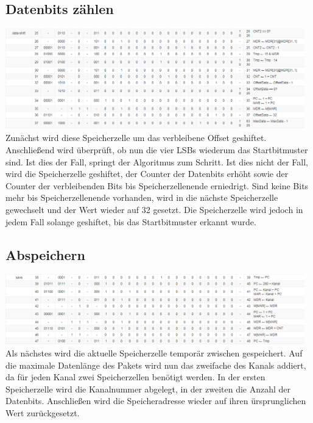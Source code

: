 \documentclass[12pt,titlepage,german,a4]{article}
\begin{document}
    \subsection{Datenbits z{\"a}hlen}
	\includegraphics[width=13cm]{img/k4.png} \\
    Zun{\"a}chst wird diese Speicherzelle um das verbleibene Offset geshiftet. Anschlie{\ss}end wird {\"u}berpr{\"u}ft, ob nun die vier LSBs wiederum das Startbitmuster sind. Ist dies der Fall, springt der Algoritmus zum Schritt. Ist dies nicht der Fall, wird die Speicherzelle geshiftet, der Counter der Datenbits erh{\"o}ht sowie der Counter der verbleibenden Bits bis Speicherzellenende erniedrigt. Sind keine Bits mehr bis Speicherzellenende vorhanden, wird in die n{\"a}chste Speicherzelle gewechselt und der Wert wieder auf 32 gesetzt. Die Speicherzelle wird jedoch in jedem Fall solange geshiftet, bis das Startbitmuster erkannt wurde.

    \subsection{Abspeichern}
	\includegraphics[width=13cm]{img/k5.png} \\
    Als n{\"a}chstes wird die aktuelle Speicherzelle tempor{\"a}r zwischen gespeichert. Auf die maximale Datenl{\"a}nge des Pakets wird nun das zweifache des Kanals addiert, da f{\"u}r jeden Kanal zwei Speicherzellen ben{\"o}tigt werden. In der ersten Speicherzelle wird die Kanalnummer abgelegt, in der zweiten die Anzahl der Datenbits. Anschlie{\ss}en wird die Speicheradresse wieder auf ihren {\"u}rsprunglichen Wert zur{\"u}ckgesetzt.
\end{document}
